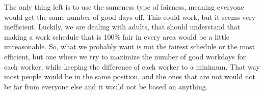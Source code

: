 The only thing left is to use the sameness type of fairness, meaning everyone would get the same number of good days off. This could work, but it seems very inefficient. Luckily, we are dealing with adults, that should understand that making a work schedule that is 100\% fair in every area would be a little unreasonable. So, what we probably want is not the fairest schedule or the most efficient, but one where we try to maximize the number of good workdays for each worker, while keeping the difference of each worker to a minimum. That way most people would be in the same position, and the ones that are not would not be far from everyone else and it would not be based on anything. 

